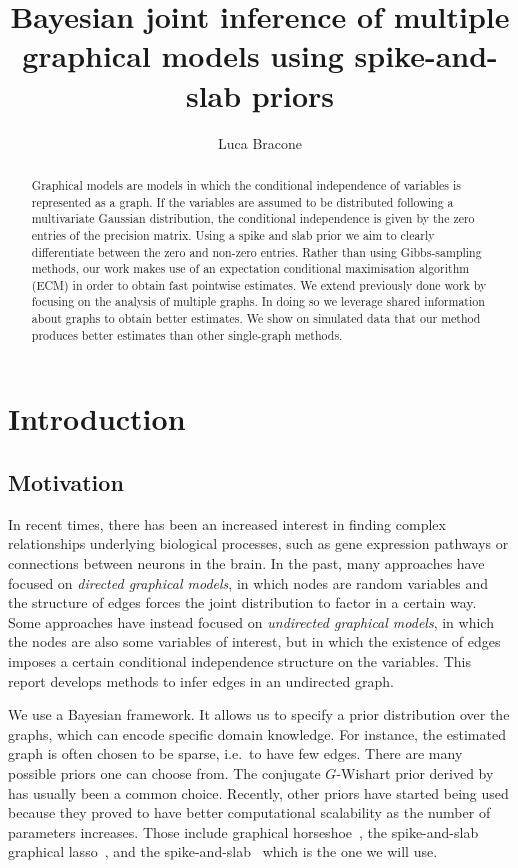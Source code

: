 \documentclass[a4paper, 11pt, oneside]{report}
\author{Luca Bracone}
\title{Bayesian joint inference of multiple graphical models using
	spike-and-slab priors}
\newcommand{\1}{\mathds{1}}
\begin{document}
\maketitle

\begin{abstract}
	Graphical models are models in which the conditional independence of
	variables is represented as a graph. If the variables are assumed to be
	distributed following a multivariate Gaussian distribution, the conditional
	independence is given by the zero entries of the precision matrix. Using a
	spike and slab prior we aim to clearly differentiate between the zero and
	non-zero entries. Rather than using Gibbs-sampling methods, our work makes
	use of an expectation conditional maximisation algorithm (ECM) in order to
	obtain fast pointwise estimates. We extend previously done work by focusing
	on the analysis of multiple graphs. In doing so we leverage shared
	information about graphs to obtain better estimates. We show on simulated
	data that our method produces better estimates than other single-graph
	methods.
\end{abstract}

\chapter{Introduction}
\section{Motivation}
In recent times, there has been an increased interest in finding complex
relationships underlying biological processes, such as gene expression pathways
or connections between neurons in the brain. In the past, many approaches have
focused on \emph{directed graphical models}, in which nodes are random
variables and the structure of edges forces the joint distribution to factor in
a certain way. Some approaches have instead focused on \emph{undirected
	graphical models}, in which the nodes are also some variables of interest, but
in which the existence of edges imposes a certain conditional independence
structure on the variables. This report develops methods to infer edges in an
undirected graph.

We use a Bayesian framework. It allows us to specify a prior distribution over the
graphs, which can encode specific domain knowledge. For instance, the estimated
graph is often chosen to be sparse, i.e.\ to have few edges.
There are many possible priors one can choose from.
The conjugate $G$-Wishart prior derived by~\cite{HyperInverseWRovera2002}
has usually been a common choice.
Recently, other priors have started being used because they proved to have
better computational scalability as the number of parameters increases.
Those include graphical horseshoe~\parencite{cami2022}, the spike-and-slab
graphical lasso~\parencite{limm2018}, and the
spike-and-slab~\parencite{wang-2015} which is the one we will use.
\end{document}
